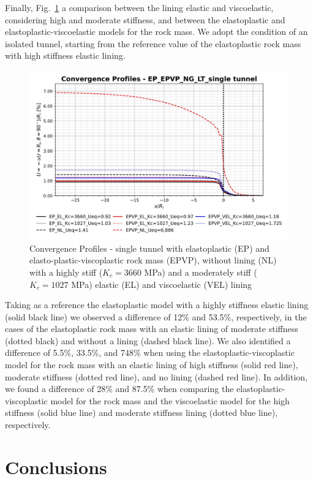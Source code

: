 \documentclass[a4paper,fleqn]{cas-sc}
\begin{document}
Finally, Fig.~\ref{EP_EPVP_NG_LT_single tunnel} a comparison between the lining elastic and viscoelastic, considering high and moderate stiffness, and between the elastoplastic and elastoplastic-viscoelastic models for the rock mass. We adopt the condition of an isolated tunnel, starting from the reference value of the elastoplastic rock mass with high stiffness elastic lining. 
\begin{figure}[h!]
	\centering
	\includegraphics[scale=0.5]{Convergence Profiles - EP_EPVP_NG_LT_single tunnel.pdf}
	\caption{Convergence Profiles - single tunnel with elastoplastic (EP) and elasto-plastic-viscoplastic rock mass (EPVP), without lining (NL) with a highly stiff ($K_c = 3660$ MPa) and a moderately stiff ($K_c = 1027$ MPa) elastic (EL) and viscoelastic (VEL) lining}
	\label{EP_EPVP_NG_LT_single tunnel}
\end{figure}
\FloatBarrier
Taking as a reference the elastoplastic model with a highly stiffness elastic lining (solid black line) we observed a difference of 12\% and 53.5\%, respectively, in the cases of the elastoplastic rock mass with an elastic lining of moderate stiffness (dotted black) and without a lining (dashed black line). We also identified a difference of 5.5\%, 33.5\%, and 748\% when using the elastoplastic-viscoplastic model for the rock mass with an elastic lining of high stiffness (solid red line), moderate stiffness (dotted red line), and no lining (dashed red line). In addition, we found a difference of 28\% and 87.5\% when comparing the elastoplastic-viscoplastic model for the rock mass and the viscoelastic model for the high stiffness (solid blue line) and moderate stiffness lining (dotted blue line), respectively.

\section{Conclusions}\label{}
\end{document}
